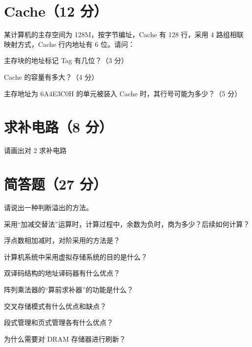 \documentclass[fontset=exam]{exam-zh}
\begin{document}
\section{Cache（12 分）}
某计算机的主存空间为 128M，按字节编址，Cache 有 128 行，采用 4 路组相联映射方式，Cache 行内地址有 6 位。请问：\par
\begin{question}[index=1]
主存块的地址标记 Tag 有几位？（3 分）
\end{question}
\begin{question}[index=2]
Cache 的容量有多大？（4 分）
\end{question}
\begin{question}[index=3]
主存地址为 6A4E3C0H 的单元被装入 Cache 时，其行号可能为多少？（5 分）
\end{question}
\section{求补电路（8 分）}
请画出对 2 求补电路\par
{}
\section{简答题（27 分）}
\begin{question}[index=1]
请说出一种判断溢出的方法。
\end{question}
\begin{question}[index=2]
采用“加减交替法”运算时，计算过程中，余数为负时，商为多少？后续如何计算？
\end{question}
\begin{question}[index=3]
浮点数相加减时，对阶采用的方法是？
\end{question}
\begin{question}[index=4]
计算机系统中采用虚拟存储系统的目的是什么？
\end{question}
\begin{question}[index=5]
双译码结构的地址译码器有什么优点？
\end{question}
\begin{question}[index=6]
阵列乘法器的“算前求补器”的功能是什么？
\end{question}
\begin{question}[index=7]
交叉存储模式有什么优点和缺点？
\end{question}
\begin{question}[index=8]
段式管理和页式管理各有什么优点？
\end{question}
\begin{question}[index=9]
为什么需要对 DRAM 存储器进行刷新？
\end{question}
\end{document}
